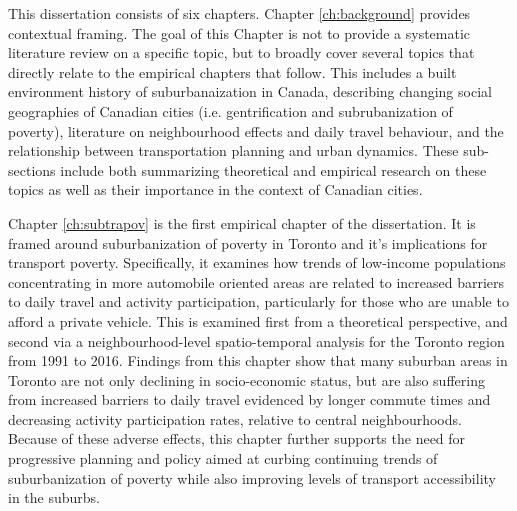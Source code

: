 This dissertation consists of six chapters. Chapter \ref{ch:background} provides contextual framing. The goal of this Chapter is not to provide a systematic literature review on a specific topic, but to broadly cover several topics that directly relate to the empirical chapters that follow. This includes a built environment history of suburbanaization in Canada, describing changing social geographies of Canadian cities (i.e. gentrification and subrubanization of poverty), literature on neighbourhood effects and daily travel behaviour, and the relationship between transportation planning and urban dynamics. These sub-sections include both summarizing theoretical and empirical research on these topics as well as their importance in the context of Canadian cities.

Chapter \ref{ch:subtrapov} is the first empirical chapter of the dissertation. It is framed around suburbanization of poverty in Toronto and it's implications for transport poverty. Specifically, it examines how trends of low-income populations concentrating in more automobile oriented areas are related to increased barriers to daily travel and activity participation, particularly for those who are unable to afford a private vehicle. This is examined first from a theoretical perspective, and second via a neighbourhood-level spatio-temporal analysis for the Toronto region from 1991 to 2016. Findings from this chapter show that many suburban areas in Toronto are not only declining in socio-economic status, but are also suffering from increased barriers to daily travel evidenced by longer commute times and decreasing activity participation rates, relative to central neighbourhoods. Because of these adverse effects, this chapter further supports the need for progressive planning and policy aimed at curbing continuing trends of suburbanization of poverty while also improving levels of transport accessibility in the suburbs.

